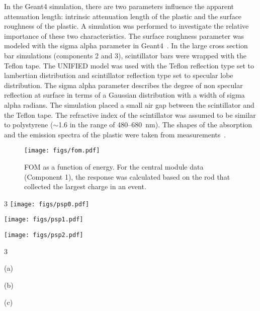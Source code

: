 \documentclass[final,5p,times,twocolumn]{elsarticle}
\begin{document}
In the Geant4 simulation, there are two parameters influence the apparent attenuation length: intrinsic attenuation length of the plastic and the surface roughness of the plastic. A simulation was performed to investigate the relative importance of these two characteristics. The surface roughness parameter was modeled with the %
sigma alpha %
parameter in Geant4~\cite{sigmaalpha}. In the large cross section bar simulations (components 2 and 3), scintillator bars were wrapped with the Teflon tape. The %
UNIFIED %
model was used with the Teflon reflection type set to lambertian distribution and scintillator reflection type set to specular lobe distribution. The %
sigma alpha %
parameter describes the degree of non specular reflection at surface in terms of a Gaussian distribution with a width of %
sigma alpha %
radians. 
The simulation placed a small air gap between the scintillator and the Teflon tape. The refractive index of the scintillator was assumed to be similar to polystyrene ($\sim$1.6 in the range of 480--680~nm). The shapes of the absorption and the emission spectra of the plastic were taken from measurements~\cite{Mabe_2019}.

\begin{figure}[ht]
\centering\texttt{[image: figs/fom.pdf]} 
\caption{FOM as a function of energy. For the central module data (Component 1), the response was calculated based on the rod that collected the largest charge in an event.}
\label{fig_fom}
\end{figure}

\begin{figure*}
\begin{multicols}{3}
    \texttt{[image: figs/psp0.pdf]} \par 
    \texttt{[image: figs/psp1.pdf]} \par 
    \texttt{[image: figs/psp2.pdf]} \par 
\end{multicols}
\begin{multicols}{3}
\begin{centering}
    (a) \par 
    (b) \par 
    (c) \par 
\end{centering}
\end{multicols}
\vspace{-0.3cm}
\caption{PSP-energy responses to $^{252}$Cf source of (a)~component 1, (b)~component 2, and (c)~component 3.}
\label{fig_psp}
\end{figure*}
\end{document}
